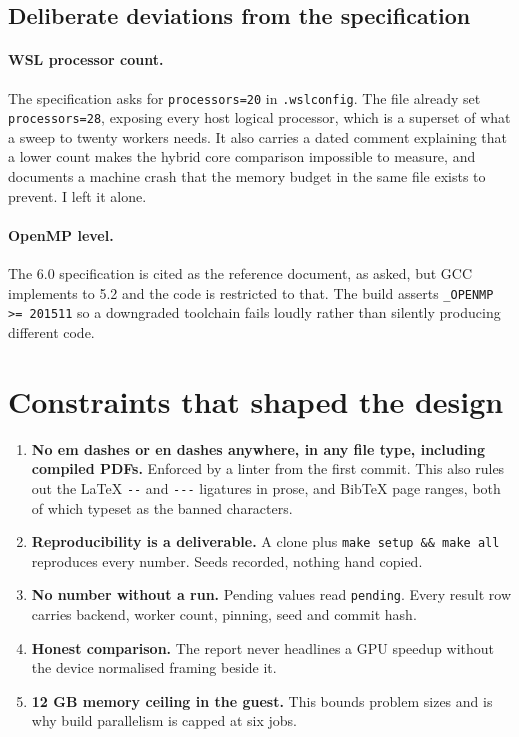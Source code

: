 \documentclass[11pt,a4paper]{report}
\begin{document}
\subsection{Deliberate deviations from the specification}

\paragraph{WSL processor count.} The specification asks for
\texttt{processors=20} in \texttt{.wslconfig}. The file already set
\texttt{processors=28}, exposing every host logical processor, which is a
superset of what a sweep to twenty workers needs. It also carries a dated comment
explaining that a lower count makes the hybrid core comparison impossible to
measure, and documents a machine crash that the memory budget in the same file
exists to prevent. I left it alone.

\paragraph{OpenMP level.} The 6.0 specification is cited as the reference
document, as asked, but GCC implements to 5.2 and the code is restricted to that.
The build asserts \texttt{\_OPENMP >= 201511} so a downgraded toolchain fails
loudly rather than silently producing different code.

\section{Constraints that shaped the design}

\begin{enumerate}[leftmargin=*]
  \item \textbf{No em dashes or en dashes anywhere, in any file type, including
        compiled PDFs.} Enforced by a linter from the first commit. This also
        rules out the LaTeX \verb|--| and \verb|---| ligatures in prose, and
        BibTeX page ranges, both of which typeset as the banned characters.
  \item \textbf{Reproducibility is a deliverable.} A clone plus
        \texttt{make setup \&\& make all} reproduces every number. Seeds
        recorded, nothing hand copied.
  \item \textbf{No number without a run.} Pending values read \texttt{pending}.
        Every result row carries backend, worker count, pinning, seed and commit
        hash.
  \item \textbf{Honest comparison.} The report never headlines a GPU speedup
        without the device normalised framing beside it.
  \item \textbf{12 GB memory ceiling in the guest.} This bounds problem sizes and
        is why build parallelism is capped at six jobs.
\end{enumerate}
\end{document}
